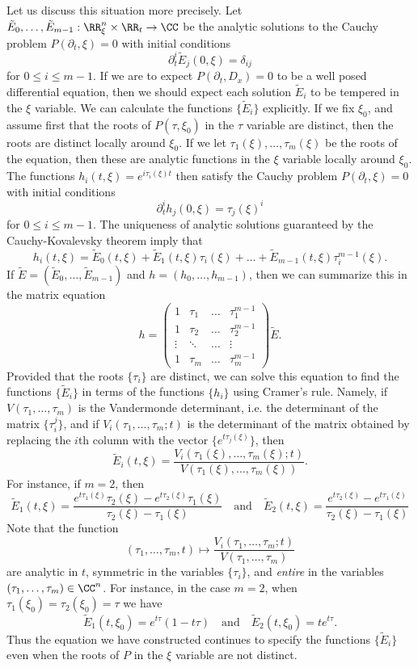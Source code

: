 Let us discuss this situation more precisely. Let $\tilde{E}_0, \dots, \tilde{E}_{m-1}: \RR^n_\xi \times \RR_t \to \CC$ be the analytic solutions to the Cauchy problem $P(\partial_t,\xi) = 0$ with initial conditions
%
\[ \partial_t^i \tilde{E}_j(0,\xi) = \delta_{ij} \]
%
for $0 \leq i \leq m-1$. If we are to expect $P(\partial_t, D_x) = 0$ to be a well posed differential equation, then we should expect each solution $\tilde{E}_i$ to be tempered in the $\xi$ variable. We can calculate the functions $\{ \tilde{E}_i \}$ explicitly. If we fix $\xi_0$, and assume first that the roots of $P(\tau,\xi_0)$ in the $\tau$ variable are distinct, then the roots are distinct locally around $\xi_0$. If we let $\tau_1(\xi),\dots,\tau_m(\xi)$ be the roots of the equation, then these are analytic functions in the $\xi$ variable locally around $\xi_0$. The functions $h_i(t,\xi) = e^{i \tau_i(\xi) t}$ then satisfy the Cauchy problem $P(\partial_t,\xi) = 0$ with initial conditions
%
\[ \partial_t^i h_j(0,\xi) = \tau_j(\xi)^i \]
%
for $0 \leq i \leq m-1$. The uniqueness of analytic solutions guaranteed by the Cauchy-Kovalevsky theorem imply that
%
\[ h_i(t,\xi) = \tilde{E}_0(t,\xi) + \tilde{E}_1(t,\xi) \tau_i(\xi) + \dots + \tilde{E}_{m-1}(t,\xi) \tau_i^{m-1}(\xi). \]
%
If $\tilde{E} = (\tilde{E}_0,\dots,\tilde{E}_{m-1})$ and $h = (h_0,\dots,h_{m-1})$, then we can summarize this in the matrix equation
%
\[ h = \begin{pmatrix} 1 & \tau_1 & \dots & \tau_1^{m-1} \\ 1 & \tau_2 & \dots & \tau_2^{m-1} \\ \vdots & \ddots & \dots & \vdots \\ 1 & \tau_m & \dots & \tau_m^{m-1} \end{pmatrix} \tilde{E}. \]
%
Provided that the roots $\{ \tau_i \}$ are distinct, we can solve this equation to find the functions $\{ \tilde{E}_i \}$ in terms of the functions $\{ h_i \}$ using Cramer's rule. Namely, if $V(\tau_1,\dots,\tau_m)$ is the Vandermonde determinant, i.e. the determinant of the matrix $\{ \tau_i^j \}$, and if $V_i(\tau_1,\dots,\tau_m;t)$ is the determinant of the matrix obtained by replacing the $i$th column with the vector $\{ e^{t \tau_j(\xi)} \}$, then
%
\[ \tilde{E}_i(t,\xi) = \frac{V_i(\tau_1(\xi),\dots,\tau_m(\xi);t)}{V(\tau_1(\xi),\dots,\tau_m(\xi))}. \]
%
For instance, if $m = 2$, then
%
\[ \tilde{E}_1(t,\xi) = \frac{e^{t \tau_1(\xi)} \tau_2(\xi) - e^{t \tau_2(\xi)} \tau_1(\xi)}{\tau_2(\xi) - \tau_1(\xi)} \quad\text{and}\quad \tilde{E}_2(t,\xi) = \frac{e^{t \tau_2(\xi)} - e^{t \tau_1(\xi)}}{\tau_2(\xi) - \tau_1(\xi)} \]
%
Note that the function
%
\[ (\tau_1,\dots,\tau_m,t) \mapsto \frac{V_i(\tau_1,\dots,\tau_m;t)}{V(\tau_1,\dots,\tau_m)} \]
%
are analytic in $t$, symmetric in the variables $\{ \tau_i \}$, and \emph{entire} in the variables $(\tau_1,\dots,\tau_m) \in \CC^n$. For instance, in the case $m = 2$, when $\tau_1(\xi_0) = \tau_2(\xi_0) = \tau$ we have
%
\[ \tilde{E}_1(t,\xi_0) = e^{t \tau} (1 - t \tau) \quad\text{and}\quad \tilde{E}_2(t,\xi_0) = t e^{t \tau}. \]
%
Thus the equation we have constructed continues to specify the functions $\{ \tilde{E}_i \}$ even when the roots of $P$ in the $\xi$ variable are not distinct.

